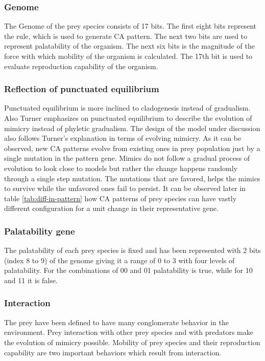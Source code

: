 \documentclass[letterpaper]{article}
\numberwithin{equation}{section}
\begin{document}
\subsubsection{Genome}
The Genome of the prey species consists of 17 bits. The first eight bits represent the rule, which is used to generate CA pattern. The next two bits are used to represent palatability of the organism. The next six bits is the magnitude of the force with which mobility of the organism is calculated. The 17th bit is used to evaluate reproduction capability of the organism.

\subsubsection{Reflection of punctuated equilibrium}
\label{subsubsec:reflection-of-punctuated-equilibrium}
Punctuated equilibrium is more inclined to cladogenesis instead of gradualism. Also Turner \citep{turner1988} emphasizes on punctuated equilibrium to describe the evolution of mimicry instead of phyletic gradualism. The design of the model under discussion also follows Turner's explanation in terms of evolving mimicry. As it can be observed, new CA patterns evolve from existing ones in prey population just by a single mutation in the pattern gene. Mimics do not follow a gradual process of evolution to look close to models but rather the change happens randomly through a single step mutation. The mutations that are favored, helps the mimics to survive while the unfavored ones fail to persist. It can be observed later in table \ref{tab:diff-in-pattern} how CA patterns of prey species can have vastly different configuration for a unit change in their representative gene. 

\subsubsection{Palatability gene}
\label{subsubsec:genetic-palatability-representation}
The palatability of each prey species is fixed and has been represented with 2 bits (index 8 to 9) of the genome giving it a range of 0 to 3 with four levels of palatability. For the combinations of 00 and 01 palatability is true, while for 10 and 11 it is false.

\subsubsection{Interaction}
The prey have been defined to have many conglomerate behavior in the environment. Prey interaction with other prey species and with predators make the evolution of mimicry possible. Mobility of prey species and their reproduction capability are two important behaviors which result from interaction. 
\end{document}

